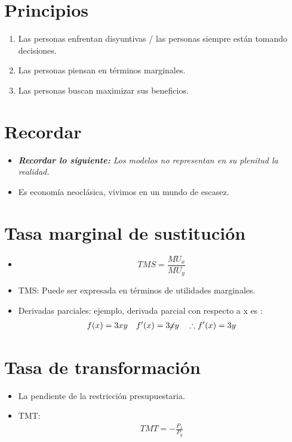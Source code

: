 \section{Principios}
\begin{enumerate}
    \item Las personas enfrentan disyuntivas / las personas siempre están tomando decisiones.
    \item Las personas piensan en términos marginales.
    \item Las personas buscan maximizar sus beneficios.
\end{enumerate}


\section{Recordar}
\begin{itemize}
    \item \emph{\textbf{Recordar lo siguiente: }Los modelos no representan en su plenitud la realidad.}
    \item Es economía neoclásica, vivimos en un mundo de escasez.
\end{itemize}


\section{Tasa marginal de sustitución}
\begin{itemize}
    \item \[
        TMS = \frac{MU_x}{MU_y} 
      \]
    
    \item TMS: Puede ser expresada en términos de utilidades marginales.
    \item Derivadas parciales: ejemplo, derivada parcial con respecto a x es :     
        \begin{align*}
            f(x) = 3x y \quad f'(x) = 3\cancel{x}y \quad \therefore f'(x) = 3y \\ 
        \end{align*}
\end{itemize}


\section{Tasa de transformación}
\begin{itemize}
    \item La pendiente de la restricción presupuestaria.
    \item TMT:
        \begin{align*}
            TMT = -\frac{P_x}{P_y} \\ 
        \end{align*}
\end{itemize}


